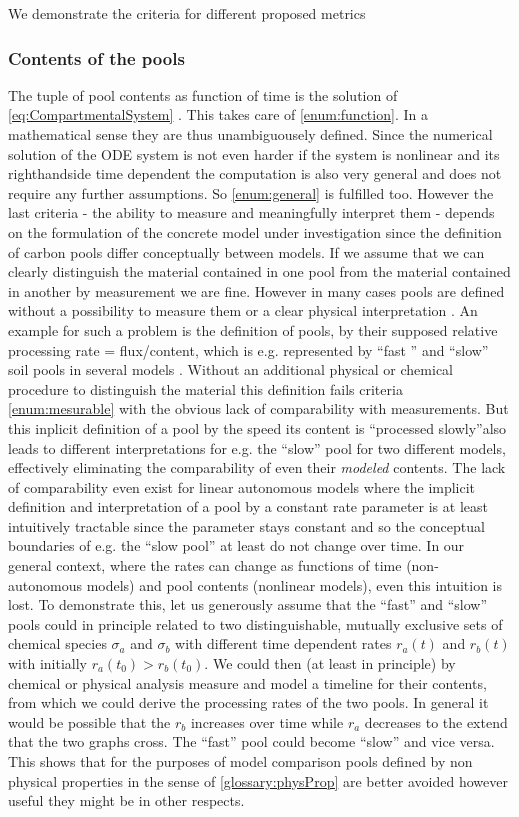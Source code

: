 We demonstrate the criteria for different proposed metrics

\subsubsection{Contents of the pools }
The tuple of pool contents as function of time is the solution of \eqref{eq:CompartmentalSystem} . This takes care of \ref{enum:function}.
In a mathematical sense they are thus unambiguousely defined. Since the numerical solution of the ODE system is not even harder if the system is nonlinear and its righthandside time dependent the computation is also very general and does not require any further assumptions.
So \ref{enum:general} is fulfilled too.
However the last criteria - the ability to measure and
meaningfully interpret them - depends on the formulation of the concrete model under investigation since the definition of carbon pools differ conceptually between models. If we assume that we can clearly distinguish the material contained in one pool from the material contained in another by measurement we are fine. 
However in many cases pools are defined without a possibility to measure them or a clear physical interpretation 
\cite{abramoff_millennial_2018}. 
An example for such a problem is the definition of pools, by their supposed relative processing rate = flux/content, which is e.g. represented by 
``fast '' and ``slow'' soil pools in several models \cite{trendy}. 
Without an additional physical or chemical procedure to distinguish the material this definition fails criteria \ref{enum:mesurable} with the obvious lack of comparability with measurements.
But this inplicit definition of a pool by the speed its content is ``processed
slowly''also leads to different interpretations for e.g. the ``slow'' pool for
two different models, effectively eliminating the comparability of even their
\emph{modeled} contents.  
The lack of comparability even exist for linear autonomous models
where the implicit definition and interpretation of a pool by a constant rate
parameter is at least intuitively tractable since the parameter stays constant
and so the conceptual boundaries of e.g. the ``slow pool'' at least do not
change over time.
In our general context, where the rates can change as functions of time (non-autonomous models) and pool contents (nonlinear models), even this intuition is lost. 
To demonstrate this, let us generously assume that the ``fast'' and ``slow'' pools could in principle related to two distinguishable, mutually exclusive sets of chemical species $\sigma_a$ and $\sigma_b$ with different time dependent rates $r_a(t)$ and $r_b(t)$ with initially $r_a(t_0) > r_b(t_0)$. 
We could then (at least in principle) by chemical or physical analysis measure and model a timeline for their contents, from which we could derive the processing rates of the two pools.
In general it would be possible that the $r_b$ increases over time while $r_a$ decreases to the extend that the two graphs cross. 
The ``fast'' pool could become ``slow'' and vice versa.
This shows that for the purposes of model comparison pools defined by non physical properties in the sense of \ref{glossary:physProp} are better avoided however useful they might be in other respects. 


